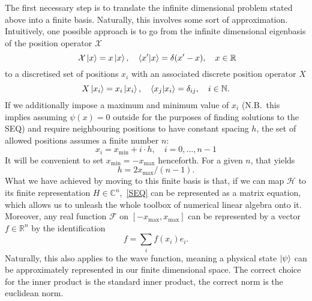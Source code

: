 \documentclass[a4paper,DIV=12,english]{scrartcl}
\begin{document}
The first necessary step is to translate the infinite dimensional problem stated above into a finite basis. Naturally, this involves some sort of approximation. Intuitively, one possible approach is to go from the infinite dimensional eigenbasis of the position operator $\mathcal{X}$
\begin{equation}\
    \mathcal{X}\ket{x} = x\ket{x},\quad \braket{x'|x}=\delta(x'-x), \quad x \in \mathbb{R}
\end{equation}
to a discretised set of positions $x_i$ with an associated discrete position operator $X$
\begin{equation}
    X \ket{x_i} = x_i \ket{x_i}, \quad \braket{x_j|x_i} = \delta_{ij}, \quad i \in \mathbb{N}.
\end{equation}
If we additionally impose a maximum and minimum value of $x_i$ (N.B.\ this implies assuming $\psi(x)=0$ outside for the purposes of finding solutions to the SEQ) and require neighbouring positions to have constant spacing $h$, the set of allowed positions assumes a finite number $n$:
\begin{equation}
    x_i = x_\text{min} + i \cdot h, \quad i = 0, \dots, n -1
\end{equation}
It will be convenient to set $x_\text{min} = -x_\text{max}$ henceforth. For a given $n$, that yields
\begin{equation}
     h = 2x_\text{max}/(n-1).
\end{equation}
What we have achieved by moving to this finite basis is that, if we can map $\mathcal{H}$ to its finite representation $H\in\mathbb{C}^n$,~\eqref{SEQ} can be represented as a matrix equation, which allows us to unleash the whole toolbox of numerical linear algebra onto it. Moreover, any real function $\mathcal{F}$ on $[-x_\text{max}, x_\text{max}]$ can be represented by a vector $f\in\mathbb{R}^n$ by the identification
\begin{equation}
    f = \sum_i f(x_i) e_i.
\end{equation}
Naturally, this also applies to the wave function, meaning a physical state $\ket{\psi}$ can be approximately represented in our finite dimensional space. The correct choice for the inner product is the standard inner product, the correct norm is the euclidean norm.
\end{document}
